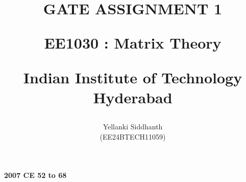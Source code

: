 \documentclass[journal]{IEEEtran}
\begin{document}

\onecolumn
\title{
GATE ASSIGNMENT 1

\large{EE1030 : Matrix Theory}

Indian Institute of Technology Hyderabad
}
\author{Yellanki Siddhanth

(EE24BTECH11059)
}	




\maketitle





\bigskip

\renewcommand{\thefigure}{\theenumi}
\renewcommand{\thetable}{\theenumi}
 
    
        \textbf{2007 CE 52 to 68}
    
\end{document}
